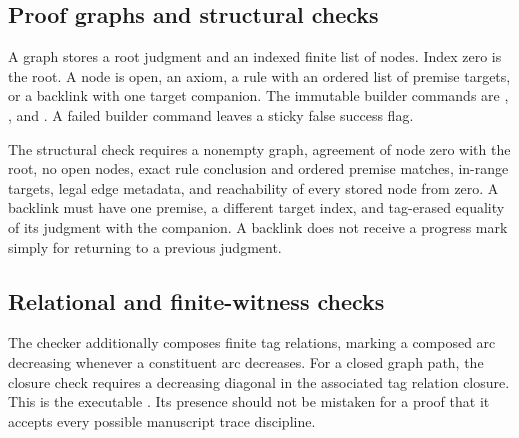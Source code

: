 \subsection{Proof graphs and structural checks}
A graph stores a root judgment and an indexed finite list of nodes. Index
zero is the root. A node is open, an axiom, a rule with an ordered list of
premise targets, or a backlink with one target companion. The immutable
builder commands are , , and .
A failed builder command leaves a sticky false success flag.

The structural check requires a nonempty graph, agreement of node zero with
the root, no open nodes, exact rule conclusion and ordered premise matches,
in-range targets, legal edge metadata, and reachability of every stored node
from zero. A backlink must have one premise, a different target index, and
tag-erased equality of its judgment with the companion. A backlink does not
receive a progress mark simply for returning to a previous judgment.

\subsection{Relational and finite-witness checks}
The checker additionally composes finite tag relations, marking a composed
arc decreasing whenever a constituent arc decreases. For a closed graph
path, the closure check requires a decreasing diagonal in the associated
tag relation closure. This is the executable .
Its presence should not be mistaken for a proof that it accepts every
possible manuscript trace discipline.

